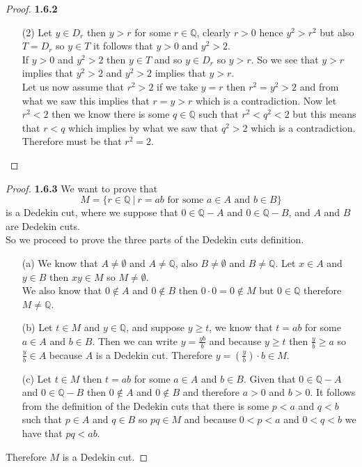 \documentclass[11pt]{article}
\newcommand{\Q}{\mathbb{Q}}
\theoremstyle{definition}
\begin{document}
\begin{proof}{\textbf{1.6.2}}
\begin{itemize}
\begin{itemize}
    \end{itemize}
\cleardoublepage
    \item [(2)]
    Let $y \in D_r$ then $y>r$ for some $r \in \Q$, clearly $r>0$ hence $y^2>r^2$ but
    also $T = D_r$ so $y \in T$ it follows that $y>0$ and $y^2>2$.\\
    If $y>0$ and $y^2 >2$ then $y \in T$ and so $y \in D_r$ so $y>r$. So we see that
    $y>r$ implies that $y^2>2$ and $y^2>2$ implies that $y>r$.\\
    Let us now assume that $r^2>2$ if we take $y=r$ then $r^2=y^2>2$ and from what we 
    saw this implies that $r=y>r$ which is a contradiction.
    Now let $r^2<2$ then we know there is some $q \in \Q$ such that $r^2<q^2<2$  but
    this means that $r<q$ which implies by what we saw that $q^2>2$ which is a
    contradiction. Therefore must be that $r^2 = 2$. 
    \end{itemize}
    \end{proof}
    \begin{proof}{\textbf{1.6.3}}
        We want to prove that
        $$M = \{r \in \Q ~|~ r=ab \text{ for some }a\in A\text{ and }b \in B\}$$
        is a Dedekin cut, where we suppose that $0 \in \Q -A$ and $0 \in \Q -B$, and
        $A$ and $B$ are Dedekin cuts.\\
        So we proceed to prove the three parts of the Dedekin cuts definition.
        \begin{itemize}
        \item [(a)] We know that $A \neq \emptyset$ and $A \neq \Q$, also
        $B \neq \emptyset$ and $B \neq \Q$. Let $x \in A$ and $y \in B$ then $xy \in M$
        so $M \neq \emptyset$.\\
        We also know that $0 \notin A$ and $0 \notin B$ then $0\cdot 0 = 0 \notin M$ but
        $0 \in \Q$ therefore $M \neq \Q$.
        \item [(b)] Let $t \in M$ and $y \in \Q$, and suppose $y \geq t$, we know that
        $t=ab$ for some $a \in A$ and $b \in B$. Then we can write $y=\frac{yb}{b}$ and
        because $y \geq t$ then $\frac{y}{b} \geq a$ so $\frac{y}{b} \in A$ because $A$
        is a Dedekin cut. Therefore $y=(\frac{y}{b})\cdot b \in M$.
        \item [(c)] Let $t \in M$ then $t = ab$ for some $a \in A$ and $b \in B$. Given
        that $0 \in \Q -A$ and $0 \in \Q -B$ then $0 \notin A$ and $0 \notin B$ and
        therefore $a>0$ and $b>0$. It follows from the definition of the Dedekin cuts
        that there is some $p<a$ and $q<b$ such that $p \in A$ and $q \in B$ so
        $pq \in M$ and because $0<p<a$ and $0<q<b$ we have that $pq < ab$. 
        \end{itemize}
        Therefore $M$ is a Dedekin cut.
    \end{proof}
\end{document}
